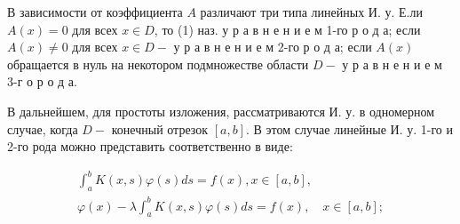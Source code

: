 \documentclass[10pt]{article}
\begin{document}
В зависимости от коэффициента $A$ различают три типа линейных И. у. Е.ли $A(x)=0$ для всех $x \in D$, то (1) наз. у р а в н е н и е м 1-го р о д а; если $A(x) \neq 0$ для всех $x \in D-$ у р а в н е н и е м 2-го р о д а; если $A(x)$ обращается в нуль на некотором подмножестве области $D-$ у р а в н е н и е м 3-г о р о д а.



В дальнейшем, для простоты изложения, рассматриваются И. у. в одномерном случае, когда $D-$ конечный отрезок $[a, b]$. В этом случае линейные И. у. 1-го и 2-го рода можно представить соответственно в виде:



\[

\begin{gathered}

\int_{a}^{b} K(x, s) \varphi(s) d s=f(x), x \in[a, b], \\

\varphi(x)-\lambda \int_{a}^{b} K(x, s) \varphi(s) d s=f(x), \quad x \in[a, b] ;

\end{gathered}

\]
\end{document}
